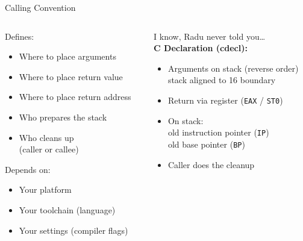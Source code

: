 \documentclass[beamer]{uibk}
\begin{document}
\begin{frame}{Calling Convention}
    \begin{columns}
        \begin{column}{0.5\textwidth}
            Defines:
            \begin{itemize}
                \item Where to place arguments
                \item Where to place return value
                \item Where to place return address
                \item Who prepares the stack
                \item Who cleans up\\
                    (caller or callee)
            \end{itemize}
            \pause
            Depends on:
            \begin{itemize}
                \item Your platform
                \item Your toolchain (language)
                \item Your settings (compiler flags)
            \end{itemize}
        \end{column}
        \pause
        \begin{column}{0.5\textwidth}
            I know, Radu never told you\dots\\
            \medskip
            \textbf{C Declaration (cdecl):}
            \begin{itemize}
                \item Arguments on stack (reverse order)\\
                    stack aligned to \SI{16}{\byte} boundary
                \item Return via register (\texttt{EAX} / \texttt{ST0})
                \item On stack:\\
                    old instruction pointer (\texttt{IP})\\
                    old base pointer (\texttt{BP})
                \item Caller does the cleanup
            \end{itemize}
        \end{column}
    \end{columns}
\end{frame}
\end{document}
